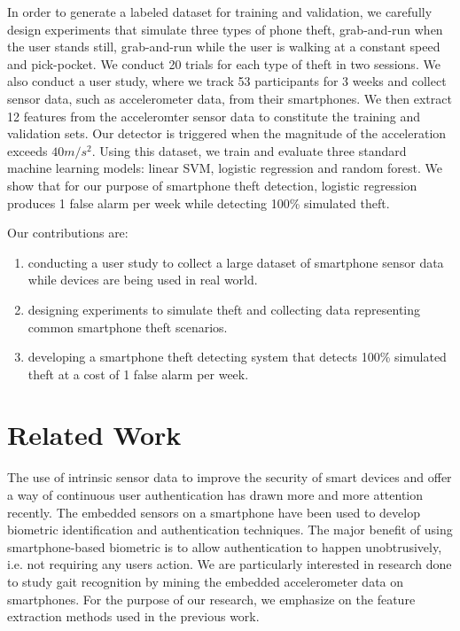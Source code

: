\documentclass{soups}
\begin{document}
In order to generate a labeled dataset for training and validation, we carefully design experiments that simulate three types of phone theft, grab-and-run when the user stands still, grab-and-run while the user is walking at a constant speed and pick-pocket. 
We conduct 20 trials for each type of theft in two sessions. We also conduct a user study, where we track 53 participants for 3 weeks and collect sensor data, such as accelerometer data, from their smartphones. 
We then extract 12 features from the acceleromter sensor data to constitute the training and validation sets. 
Our detector is triggered when the magnitude of the acceleration exceeds $40m/s^2$. Using this dataset, we train and evaluate three standard machine learning models: linear SVM, logistic regression and random forest. 
We show that for our purpose of smartphone theft detection, logistic regression produces 1 false alarm per week while detecting 100\% simulated theft.

Our contributions are:
\begin{enumerate}
  \item conducting a user study to collect a large dataset of smartphone sensor data while devices are being used in real world.
  \item designing experiments to simulate theft and collecting data representing common smartphone theft scenarios.
  \item developing a smartphone theft detecting system that detects 100\% simulated theft at a cost of 1 false alarm per week.
\end{enumerate}




\section{Related Work}

The use of intrinsic sensor data to improve the security of smart devices and offer a way of continuous user authentication has drawn more and more attention recently. 
The embedded sensors on a smartphone have been used to develop biometric identification and authentication techniques. 
The major benefit of using smartphone-based biometric is to allow authentication to happen unobtrusively, i.e. not requiring any users action. 
We are particularly interested in research done to study gait recognition by mining the embedded accelerometer data on smartphones. 
For the purpose of our research, we emphasize on the feature extraction methods used in the previous work.
\end{document}
